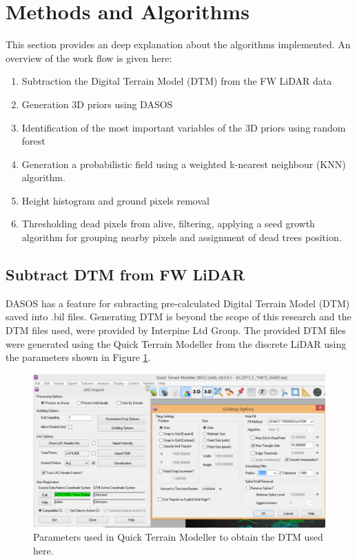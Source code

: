 \documentclass{subfiles}
\begin{document}
\section{Methods and Algorithms}

\par This section provides an deep explanation about the algorithms implemented. An overview of the work flow is given here: 
\begin{enumerate}
	\item Subtraction the Digital Terrain Model (DTM) from the FW LiDAR data
	\item Generation 3D priors using DASOS
	\item Identification of the most important variables of the 3D priors using random forest
	\item Generation a probabilistic field using a weighted k-nearest neighbour (KNN) algorithm. 
	\item Height histogram and ground pixels removal
	\item Thresholding dead pixels from alive, filtering, applying a seed growth algorithm for grouping nearby pixels and assignment of dead trees position.  
\end{enumerate}

\subsection{Subtract DTM from FW LiDAR}\label{sec:DTMsub}

\par DASOS has a feature for subracting pre-calculated Digital Terrain Model (DTM) saved into .bil files. Generating DTM is beyond the scope of this research and the DTM files used, were provided by Interpine Ltd Group. The provided DTM files were generated using the Quick Terrain Modeller from the discrete LiDAR using the parameters shown in Figure \ref{fig:DTM_parameters}.

\begin{figure} [h!]
	\centering
	\includegraphics[width=\textwidth]{img/dead/DTM_parameters}
	\caption{Parameters used in Quick Terrain Modeller to obtain the DTM used here.}
	\label{fig:DTM_parameters}
\end{figure}
\end{document}
